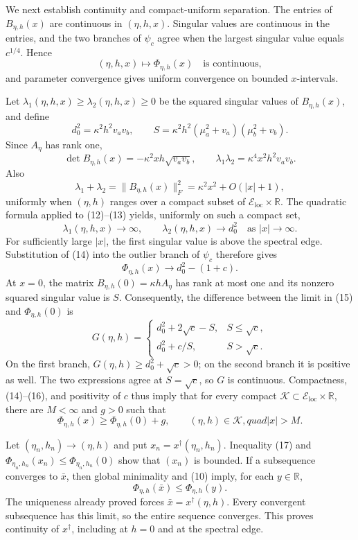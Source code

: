 We next establish continuity and compact-uniform separation.  The entries of
\(B_{\eta,h}(x)\) are continuous in \((\eta,h,x)\).  Singular values are continuous in the entries, and the two branches of \(\psi_c\) agree when the largest singular value equals \(c^{1/4}\).  Hence
\[
(\eta,h,x)\longmapsto\Phi_{\eta,h}(x)
\quad\text{is continuous}, \tag{10}
\]
and parameter convergence gives uniform convergence on bounded
\(x\)-intervals.

Let \(\lambda_1(\eta,h,x)\geq\lambda_2(\eta,h,x)\geq0\) be the squared singular values of \(B_{\eta,h}(x)\), and define
\[
d_0^2=\kappa^2h^2v_av_b,
\qquad
S=\kappa^2h^2(\mu_a^2+v_a)(\mu_b^2+v_b). \tag{11}
\]
Since \(A_\eta\) has rank one,
\[
\det B_{\eta,h}(x)=-\kappa^2xh\sqrt{v_av_b},
\qquad
\lambda_1\lambda_2=\kappa^4x^2h^2v_av_b. \tag{12}
\]
Also
\[
\lambda_1+\lambda_2
=\|B_{\eta,h}(x)\|_F^2
=\kappa^2x^2+O(|x|+1), \tag{13}
\]
uniformly when \((\eta,h)\) ranges over a compact subset of
\(\mathcal E_{\mathrm{loc}}\times\mathbb R\).  The quadratic formula applied to (12)--(13) yields, uniformly on such a compact set,
\[
\lambda_1(\eta,h,x)\longrightarrow\infty,
\qquad
\lambda_2(\eta,h,x)\longrightarrow d_0^2
\quad\text{as }|x|\longrightarrow\infty. \tag{14}
\]
For sufficiently large \(|x|\), the first singular value is above the spectral edge.  Substitution of (14) into the outlier branch of \(\psi_c\) therefore gives
\[
\Phi_{\eta,h}(x)\longrightarrow d_0^2-(1+c). \tag{15}
\]
At \(x=0\), the matrix \(B_{\eta,h}(0)=\kappa hA_\eta\) has rank at most one and its nonzero squared singular value is \(S\).  Consequently, the difference between the limit in (15) and \(\Phi_{\eta,h}(0)\) is
\[
G(\eta,h)=
\begin{cases}
d_0^2+2\sqrt c-S,&S\leq\sqrt c,\\
d_0^2+c/S,&S>\sqrt c.
\end{cases} \tag{16}
\]
On the first branch, \(G(\eta,h)\geq d_0^2+\sqrt c>0\); on the second branch it is positive as well.  The two expressions agree at \(S=\sqrt c\), so \(G\) is continuous.  Compactness, (14)--(16), and positivity of \(c\) thus imply that for every compact
\(\mathcal K\subset\mathcal E_{\mathrm{loc}}\times\mathbb R\), there are \(M<\infty\) and \(g>0\) such that
\[
\Phi_{\eta,h}(x)\geq\Phi_{\eta,h}(0)+g,
\qquad
(\eta,h)\in\mathcal K,quad |x|>M. \tag{17}
\]

Let \((\eta_n,h_n)\to(\eta,h)\) and put
\(x_n=x^\dagger(\eta_n,h_n)\).  Inequality (17) and
\(\Phi_{\eta_n,h_n}(x_n)\leq\Phi_{\eta_n,h_n}(0)\) show that \((x_n)\) is bounded.  If a subsequence converges to \(\bar x\), then global minimality and (10) imply, for each \(y\in\mathbb R\),
\[
\Phi_{\eta,h}(\bar x)
\leq\Phi_{\eta,h}(y). \tag{18}
\]
The uniqueness already proved forces
\(\bar x=x^\dagger(\eta,h)\).  Every convergent subsequence has this limit, so the entire sequence converges.  This proves continuity of \(x^\dagger\), including at \(h=0\) and at the spectral edge.

